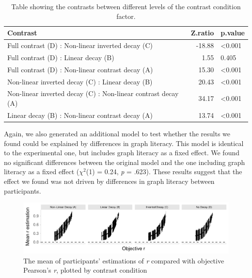 \documentclass[preprint, 3p,
authoryear]{elsarticle} %
\begin{document}
\begin{table}

\caption{\label{tab:contrasts-table-e2}\label{contrasts-table-e2}Table showing the contrasts between different levels of the contrast condition factor.}
\centering
\begin{tabular}[t]{lrl}
\toprule
Contrast & Z.ratio & p.value\\
\midrule
Full contrast (D) : Non-linear inverted decay (C) & -18.88 & <0.001\\
Full contrast (D) : Linear decay (B) & 1.55 & 0.405\\
Full contrast (D) : Non-linear contrast decay (A) & 15.30 & <0.001\\
Non-linear inverted decay (C) : Linear decay (B) & 20.43 & <0.001\\
Non-linear inverted decay (C) : Non-linear contrast decay (A) & 34.17 & <0.001\\
\addlinespace
Linear decay (B) : Non-linear contrast decay (A) & 13.74 & <0.001\\
\bottomrule
\end{tabular}
\end{table}

Again, we also generated an additional model to test whether the results
we found could be explained by differences in graph literacy. This model
is identical to the experimental one, but includes graph literacy as a
fixed effect. We found no significant differences between the original
model and the one including graph literacy as a fixed effect
(\(\chi^2\)(1) = 0.24, \emph{p} = .623). These results suggest that the
effect we found was not driven by differences in graph literacy between
participants.

\begin{figure}

{\centering \includegraphics{contrast_and_scatterplots_files/figure-latex/e2-error-plot-1} 

}

\caption{\label{e2-error-plot}The mean of participants' estimations of \textit{r} compared with objective Pearson's \textit{r}, plotted by contrast condition}\label{fig:e2-error-plot}
\end{figure}
\end{document}
